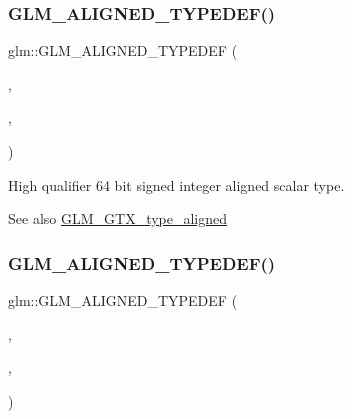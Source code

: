 \subsubsection{\texorpdfstring{G\+L\+M\+\_\+\+A\+L\+I\+G\+N\+E\+D\+\_\+\+T\+Y\+P\+E\+D\+E\+F()}{GLM\_ALIGNED\_TYPEDEF()}\hspace{0.1cm}{\footnotesize\ttfamily [36/209]}}
{\footnotesize\ttfamily glm\+::\+G\+L\+M\+\_\+\+A\+L\+I\+G\+N\+E\+D\+\_\+\+T\+Y\+P\+E\+D\+EF (\begin{DoxyParamCaption}\item[{\mbox{\hyperlink{group__gtc__type__precision_gad3cb9a0ac0266ea2c51c6fac256345d1}{highp\+\_\+i64}}}]{,  }\item[{aligned\+\_\+highp\+\_\+i64}]{,  }\item[{8}]{ }\end{DoxyParamCaption})}

High qualifier 64 bit signed integer aligned scalar type. \begin{DoxySeeAlso}{See also}
\mbox{\hyperlink{group__gtx__type__aligned}{G\+L\+M\+\_\+\+G\+T\+X\+\_\+type\+\_\+aligned}} 
\end{DoxySeeAlso}
\mbox{\label{group__gtx__type__aligned_gabd82b9faa9d4d618dbbe0fc8a1efee63}} 
\subsubsection{\texorpdfstring{G\+L\+M\+\_\+\+A\+L\+I\+G\+N\+E\+D\+\_\+\+T\+Y\+P\+E\+D\+E\+F()}{GLM\_ALIGNED\_TYPEDEF()}\hspace{0.1cm}{\footnotesize\ttfamily [37/209]}}
{\footnotesize\ttfamily glm\+::\+G\+L\+M\+\_\+\+A\+L\+I\+G\+N\+E\+D\+\_\+\+T\+Y\+P\+E\+D\+EF (\begin{DoxyParamCaption}\item[{\mbox{\hyperlink{group__gtc__type__precision_ga96254f9c1c4506fc8eb5cf3301ce8565}{int8}}}]{,  }\item[{aligned\+\_\+int8}]{,  }\item[{1}]{ }\end{DoxyParamCaption})}


